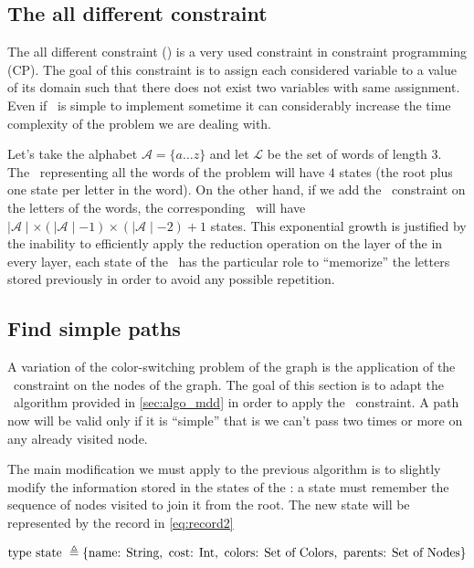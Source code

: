 \subsection{The all different constraint}


The all different constraint (\alldiff) is a very used constraint in constraint programming (CP). The goal of this constraint is to assign each considered variable to a value of its domain such that there does not exist two variables with same assignment. Even if \alldiff\ is simple to implement sometime it can considerably increase the time complexity of the problem we are dealing with.

Let's take the alphabet $\mathcal{A} = \{a \dots z\}$ and let $\mathcal{L}$ be the set of words of length $3$. The \mdd\ representing all the words of the problem will have $4$ states (the root plus one state per letter in the word). On the other hand, if we add the \alldiff\ constraint on the letters of the words, the corresponding \mdd\ will have $\mid \mathcal{A} \mid \times (\mid \mathcal{A} \mid - 1) \times (\mid \mathcal{A} \mid - 2) + 1$ states. This exponential growth is justified by the inability to efficiently apply the reduction operation on the layer of the \mdd\: in every layer, each state of the \mdd\ has the particular role to ``memorize'' the letters stored previously in order to avoid any possible repetition.

\subsection{Find simple paths}

A variation of the color-switching problem of the graph is the application of the \alldiff\ constraint on the nodes of the graph. The goal of this section is to adapt the \mdd\ algorithm provided in \cref{sec:algo_mdd} in order to apply the \alldiff\ constraint. A path now will be valid only if it is ``simple'' that is we can't pass two times or more on any already visited node.

The main modification we must apply to the previous algorithm is to slightly modify the information stored in the states of the \mdd: a state must remember the sequence of nodes visited to join it from the root. The new state will be represented by the record in \cref{eq:record2}

\begin{equation}
  \label{eq:record2}
  \text{type state } \triangleq \{\text{name: } \text{String}, \text{ cost: } \text{Int}, \text{ colors: } \text{Set of Colors}, \text{ parents: } \text{Set of Nodes} \}
\end{equation}


